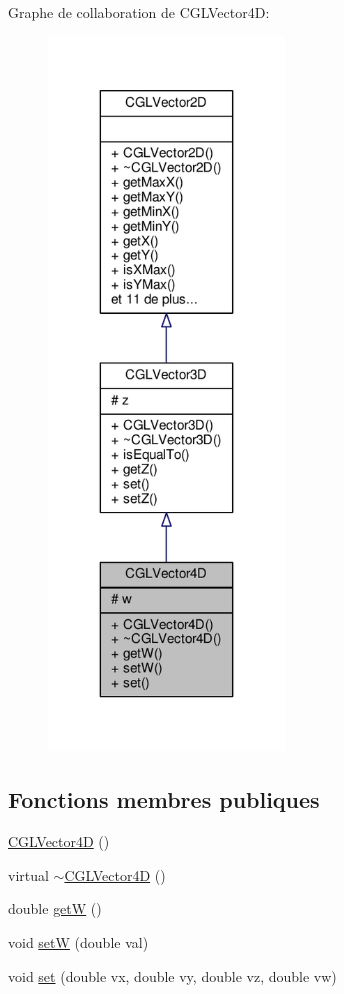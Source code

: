 Graphe de collaboration de C\-G\-L\-Vector4\-D\-:
\nopagebreak
\begin{figure}[H]
\begin{center}
\leavevmode
\includegraphics[width=178pt]{da/d0f/class_c_g_l_vector4_d__coll__graph}
\end{center}
\end{figure}
\subsection*{Fonctions membres publiques}
\begin{DoxyCompactItemize}
\item 
\hyperlink{class_c_g_l_vector4_d_aa722cb71a0a7eb1bc325f560535e0401}{C\-G\-L\-Vector4\-D} ()
\item 
virtual \hyperlink{class_c_g_l_vector4_d_aca6634e555c9b7778344d304b1d540a9}{$\sim$\-C\-G\-L\-Vector4\-D} ()
\item 
double \hyperlink{class_c_g_l_vector4_d_a3b9e7ede466c3a97efe8b818a11dfd3b}{get\-W} ()
\item 
void \hyperlink{class_c_g_l_vector4_d_a754d8afb0203dc8048dac865840565ae}{set\-W} (double val)
\item 
void \hyperlink{class_c_g_l_vector4_d_a9f4c89b5e30ad2cfb18327e5e17257ab}{set} (double vx, double vy, double vz, double vw)
\end{DoxyCompactItemize}
